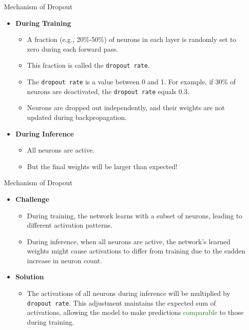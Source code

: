 \documentclass[serif, aspectratio=169]{beamer}
\begin{document}
\begin{frame}{Mechanism of Dropout}
    \begin{itemize}
        \item \textbf{During Training}
            \begin{itemize}
                \item A fraction (e.g., 20\%-50\%) of neurons in each layer is randomly set to zero during each forward pass.
                \item This fraction is called the \texttt{dropout rate}.
                \item The \texttt{dropout rate} is a value between 0 and 1. For example, if 30\% of neurons are deactivated, the \texttt{dropout rate} equals 0.3.
                \item Neurons are dropped out independently, and their weights are not updated during backpropagation.
            \end{itemize}
        \item \textbf{During Inference}
            \begin{itemize}
                \item All neurons are active.
                \item But the final weights will be larger than expected!
            \end{itemize}
    \end{itemize}
\end{frame}

\begin{frame}{Mechanism of Dropout}
    \begin{itemize} [<+-| alert@+>] %
        \item<1-> \textbf{Challenge}
            \begin{itemize}
                \item<1-> During training, the network learns with a subset of neurons, leading to different activation patterns.
                \item<1-> During inference, when all neurons are active, the network’s learned weights might cause activations to differ from training due to the sudden increase in neuron count.
            \end{itemize}
        \item<2-> \textbf{Solution}
            \begin{itemize}
                \item The activations of all neurons during inference will be multiplied by \texttt{dropout rate}. This adjustment maintains the expected sum of activations, allowing the model to make predictions \textcolor{green}{comparable} to those during training.
            \end{itemize}
    \end{itemize}
\end{frame}
\end{document}
